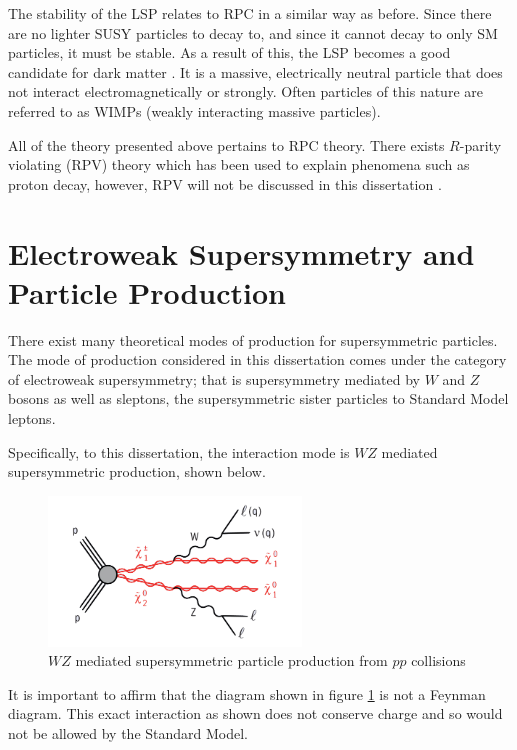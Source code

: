 The stability of the LSP relates to RPC in a similar way as before. 
Since there are no lighter SUSY particles to decay to, and since it cannot decay to only SM particles, it must be stable.
As a result of this, the LSP becomes a good candidate for dark matter \cite{jungman1996supersymmetric}.
It is a massive, electrically neutral particle that does not interact electromagnetically or strongly.
Often particles of this nature are referred to as WIMPs (weakly interacting massive particles).

All of the theory presented above pertains to RPC theory.
There exists $R$-parity violating (RPV) theory which has been used to explain phenomena such as proton decay, however, RPV will not be discussed in this dissertation \cite{barbier2005r}.

\section{Electroweak Supersymmetry and Particle Production}
There exist many theoretical modes of production for supersymmetric particles.
The mode of production considered in this dissertation comes under the category of electroweak supersymmetry; that is supersymmetry mediated by $W$ and $Z$ bosons as well as sleptons, the supersymmetric sister particles to Standard Model leptons.

Specifically, to this dissertation, the interaction mode is $WZ$ mediated supersymmetric production, shown below.

\begin{figure}[H] %
   \centering
   \includegraphics[width=0.6\textwidth]{Pictures/SUSYProduction} 
   \caption{$WZ$ mediated supersymmetric particle production from $pp$ collisions}
   \label{fig:myProduction}
\end{figure}

\noindent It is important to affirm that the diagram shown in figure \ref{fig:myProduction} is not a Feynman diagram.
This exact interaction as shown does not conserve charge and so would not be allowed by the Standard Model.


